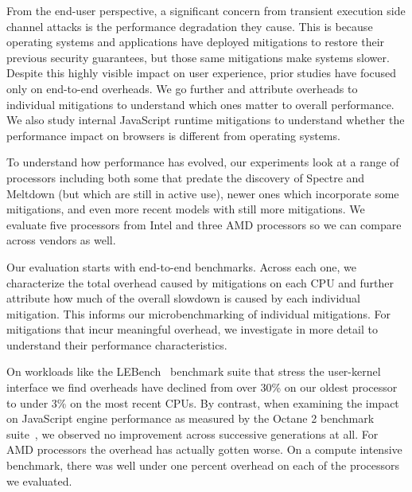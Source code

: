 
From the end-user perspective, a significant concern from transient execution side channel attacks is the performance degradation they cause.
This is because operating systems and applications have deployed mitigations to restore their previous security guarantees, but those same mitigations make systems slower.
Despite this highly visible impact on user experience, prior studies have focused only on end-to-end overheads.
We go further and attribute overheads to individual mitigations to understand which ones matter to overall performance.
We also study internal JavaScript runtime mitigations to understand whether the performance impact on browsers is different from operating systems. 

To understand how performance has evolved, our experiments look at a range of processors including both some that predate the discovery of Spectre and Meltdown (but which are still in active use), newer ones which incorporate some mitigations, and even more recent models with still more mitigations.
We evaluate five processors from Intel and three AMD processors so we can compare across vendors as well.

Our evaluation starts with end-to-end benchmarks.
Across each one, we characterize the total overhead caused by mitigations on each CPU and further attribute how much of the overall slowdown is caused by each individual mitigation.
This informs our microbenchmarking of individual mitigations.
For mitigations that incur meaningful overhead, we investigate in more detail to understand their performance characteristics.

On workloads like the LEBench~\cite{ren:lebench} benchmark suite that stress the user-kernel interface we find overheads have declined from over 30\% on our oldest processor to under 3\% on the most recent CPUs.
By contrast, when examining the impact on JavaScript engine performance as measured by the Octane 2 benchmark suite~\cite{google:octane2}, we observed no improvement across successive generations at all.
For AMD processors the overhead has actually gotten worse.
On a compute intensive benchmark, there was well under one percent overhead on each of the processors we evaluated.

